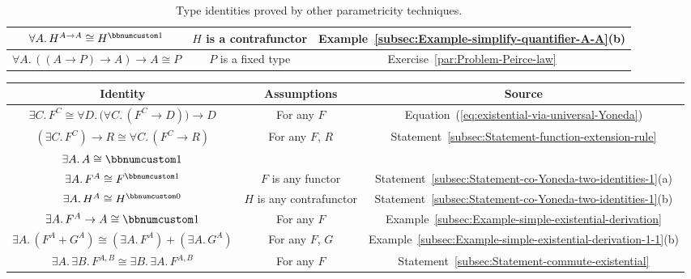 \begin{table}
\begin{centering}
\begin{tabular}{|c|c|c|}
\hline 
{\footnotesize{}$\forall A.\,H^{A\rightarrow A}\cong H^{\bbnum 1}$} & {\footnotesize{}$H$ is a contrafunctor} & {\footnotesize{}Example~\ref{subsec:Example-simplify-quantifier-A-A}(b)}\tabularnewline
\hline 
{\footnotesize{}$\forall A.\,((A\rightarrow P)\rightarrow A)\rightarrow A\cong P$} & {\footnotesize{}$P$ is a fixed type} & {\footnotesize{}Exercise~\ref{par:Problem-Peirce-law}}\tabularnewline
\hline 
\end{tabular}
\par\end{centering}
\caption{Type identities proved by other parametricity techniques.\label{tab:Type-identities-proved-by-parametricity}}
\end{table}

\begin{table}[h]
\begin{centering}
\begin{tabular}{|c|c|c|}
\hline 
\textbf{\footnotesize{}Identity} & \textbf{\footnotesize{}Assumptions} & \textbf{\footnotesize{}Source}\tabularnewline
\hline 
\hline 
{\footnotesize{}$\exists C.\,F^{C}\cong\forall D.\,\big(\forall C.\,(F^{C}\rightarrow D)\big)\rightarrow D$} & {\footnotesize{}For any $F$} & {\footnotesize{}Equation~(\ref{eq:existential-via-universal-Yoneda})}\tabularnewline
\hline 
{\footnotesize{}$(\exists C.\,F^{C})\rightarrow R\cong\forall C.\,(F^{C}\rightarrow R)$} & {\footnotesize{}For any $F$, $R$} & {\footnotesize{}Statement~\ref{subsec:Statement-function-extension-rule}}\tabularnewline
\hline 
{\footnotesize{}$\exists A.\,A\cong\bbnum 1$} &  & \tabularnewline
\hline 
{\footnotesize{}$\exists A.\,F^{A}\cong F^{\bbnum 1}$} & {\footnotesize{}$F$ is any functor} & {\footnotesize{}Statement~\ref{subsec:Statement-co-Yoneda-two-identities-1}(a)}\tabularnewline
\hline 
{\footnotesize{}$\exists A.\,H^{A}\cong H^{\bbnum 0}$} & {\footnotesize{}$H$ is any contrafunctor} & {\footnotesize{}Statement~\ref{subsec:Statement-co-Yoneda-two-identities-1}(b)}\tabularnewline
\hline 
{\footnotesize{}$\exists A.\,F^{A}\rightarrow A\cong\bbnum 1$} & {\footnotesize{}For any $F$} & {\footnotesize{}Example~\ref{subsec:Example-simple-existential-derivation}}\tabularnewline
\hline 
{\footnotesize{}$\exists A.\,(F^{A}+G^{A})\cong(\exists A.\,F^{A})+(\exists A.\,G^{A})$} & {\footnotesize{}For any $F$, $G$} & {\footnotesize{}Example~\ref{subsec:Example-simple-existential-derivation-1-1}(b)}\tabularnewline
\hline 
{\footnotesize{}$\exists A.\,\exists B.\,F^{A,B}\cong\exists B.\,\exists A.\,F^{A,B}$} & {\footnotesize{}For any $F$} & {\footnotesize{}Statement~\ref{subsec:Statement-commute-existential}}\tabularnewline

\end{tabular}
\end{centering}
\end{table}
